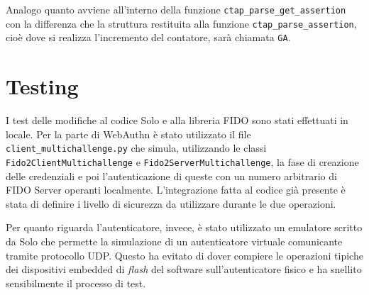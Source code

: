 Analogo quanto avviene all'interno della funzione \verb*|ctap_parse_get_assertion| con la differenza che la struttura restituita alla funzione \verb*|ctap_parse_assertion|, cioè dove si realizza l'incremento del contatore, sarà chiamata \verb*|GA|.


\section{Testing}
\label{testing}

I test delle modifiche al codice Solo e alla libreria FIDO sono stati effettuati in locale. Per la parte di WebAuthn è stato utilizzato il file \verb*|client_multichallenge.py| che simula, utilizzando le classi \verb*|Fido2ClientMultichallenge| e \verb*|Fido2ServerMultichallenge|, la fase di creazione delle credenziali e poi l'autenticazione di queste con un numero arbitrario di FIDO Server operanti localmente. 
L'integrazione fatta al codice già presente è stata di definire i livello di sicurezza da utilizzare durante le due operazioni. 

Per quanto riguarda l'autenticatore, invece, è stato utilizzato un emulatore scritto da Solo che permette la simulazione di un autenticatore virtuale comunicante tramite protocollo UDP. Questo ha evitato di dover compiere le operazioni tipiche dei dispositivi embedded di \emph{flash} del software sull'autenticatore fisico e ha snellito sensibilmente il processo di test. 

